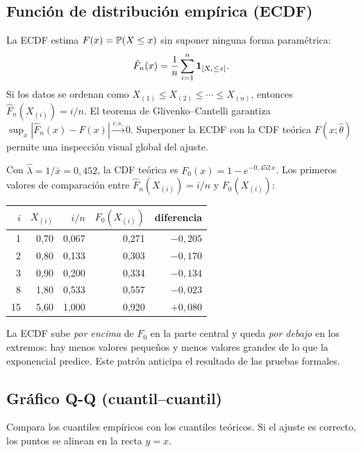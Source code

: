 \documentclass[11pt, letterpaper]{article}
\begin{document}
\subsection{Función de distribución empírica (ECDF)}

La ECDF estima $F(x) = \mathbb{P}(X \le x)$ sin suponer ninguna forma paramétrica:
\[
\hat{F}_n(x) = \frac{1}{n}\sum_{i=1}^{n}\mathbf{1}_{[X_i \le x]}.
\]
Si los datos se ordenan como $X_{(1)} \le X_{(2)} \le \cdots \le X_{(n)}$, entonces $\hat{F}_n(X_{(i)}) = i/n$. El teorema de Glivenko--Cantelli garantiza $\sup_x|\hat{F}_n(x)-F(x)| \xrightarrow{c.s.} 0$. Superponer la ECDF con la CDF teórica $F(x;\hat\theta)$ permite una inspección visual global del ajuste.

\begin{ejemplobox}
Con $\hat\lambda = 1/\bar x = 0{,}452$, la CDF teórica es $F_0(x) = 1 - e^{-0{,}452\,x}$. Los primeros valores de comparación entre $\hat F_n(X_{(i)}) = i/n$ y $F_0(X_{(i)})$:

\begin{center}\scriptsize
\renewcommand{\arraystretch}{1.15}
\begin{tabular}{rrrrr}
\toprule
$i$ & $X_{(i)}$ & $i/n$ & $F_0(X_{(i)})$ & diferencia \\
\midrule
1 & 0{,}70 & 0{,}067 & 0{,}271 & $-0{,}205$ \\
2 & 0{,}80 & 0{,}133 & 0{,}303 & $-0{,}170$ \\
3 & 0{,}90 & 0{,}200 & 0{,}334 & $-0{,}134$ \\
8 & 1{,}80 & 0{,}533 & 0{,}557 & $-0{,}023$ \\
15 & 5{,}60 & 1{,}000 & 0{,}920 & $+0{,}080$ \\
\bottomrule
\end{tabular}
\end{center}

La ECDF sube \emph{por encima} de $F_0$ en la parte central y queda \emph{por debajo} en los extremos: hay menos valores pequeños y menos valores grandes de lo que la exponencial predice. Este patrón anticipa el resultado de las pruebas formales.
\end{ejemplobox}

\subsection{Gráfico Q-Q (cuantil--cuantil)}

Compara los cuantiles empíricos con los cuantiles teóricos. Si el ajuste es correcto, los puntos se alinean en la recta $y = x$.
\end{document}
